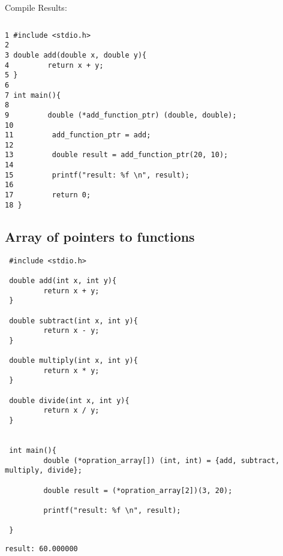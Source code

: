Compile Results:
\begin{lstlisting} 

\end{lstlisting}


\begin{lstlisting} 
1 #include <stdio.h>
2
3 double add(double x, double y){
4         return x + y;
5 }
6
7 int main(){
8
9         double (*add_function_ptr) (double, double);
10
11         add_function_ptr = add;
12
13         double result = add_function_ptr(20, 10);
14
15         printf("result: %f \n", result);
16
17         return 0;
18 }
\end{lstlisting}

\subsection{Array of pointers to functions}

\begin{lstlisting} 
 #include <stdio.h>

 double add(int x, int y){
         return x + y;
 }

 double subtract(int x, int y){
         return x - y;
 }

 double multiply(int x, int y){
         return x * y;
 }

 double divide(int x, int y){
         return x / y;
 }


 int main(){
         double (*opration_array[]) (int, int) = {add, subtract, multiply, divide};

         double result = (*opration_array[2])(3, 20);

         printf("result: %f \n", result);

 }
\end{lstlisting}

\begin{lstlisting} 
result: 60.000000
\end{lstlisting}

